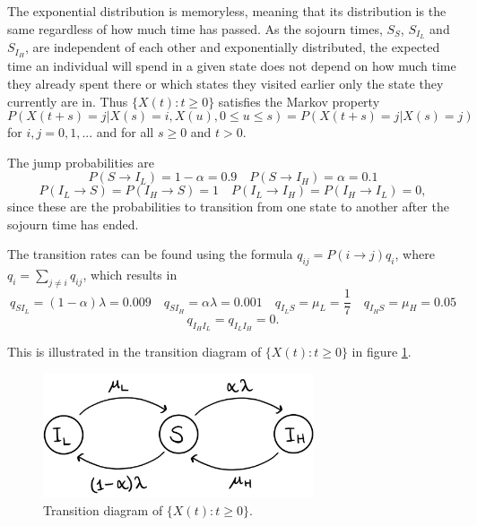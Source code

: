 The exponential distribution is memoryless, meaning that its distribution is the same regardless of how much time has passed. As the sojourn times, $S_S$, $S_{I_L}$ and $S_{I_H}$, are independent of each other and exponentially distributed, the expected time an individual will spend in a given state does not depend on how much time they already spent there or which states they visited earlier only the state they currently are in. Thus $\{X(t):t \geq 0 \}$  satisfies the Markov property
$$P(X(t+s)=j|X(s)=i, X(u), 0 \leq u \leq s)=P(X(t+s)=j|X(s)=j)$$ 
for $i,j = 0,1,...$ and for all $s \geq 0$ and $t >0 $.


The jump probabilities are 
$$P(S \rightarrow I_L)= 1 - \alpha = 0.9 \quad P(S \rightarrow I_H)= \alpha = 0.1$$ 
$$P(I_L \rightarrow S)= P(I_H \rightarrow S) = 1 \quad P(I_L \rightarrow I_H)= P(I_H \rightarrow I_L) = 0,$$ 
since these are the probabilities to transition from one state to another after the sojourn time has ended.


The transition rates can be found using the formula $q_{ij} = P(i \rightarrow j ) q_i$, where $q_i = \sum_{j \neq i} q_{ij}$, which results in
$$q_{SI_L} = (1-\alpha)\lambda = 0.009 \quad q_{SI_H} = \alpha \lambda = 0.001 \quad q_{I_LS} = \mu_L = \frac17  \quad q_{I_HS} = \mu_H = 0.05 $$
$$ q_{I_HI_L}=q_{I_LI_H}=0. $$

This is illustrated in the transition diagram of $\{X(t):t \geq 0 \}$ in figure \ref{transdiagramA}.

\begin{figure}
    \centering
    \includegraphics[width=80mm]{TransDiag1A.png}
    \caption{Transition diagram of $\{X(t):t\geq0\}$.}
    \label{transdiagramA}
\end{figure}




